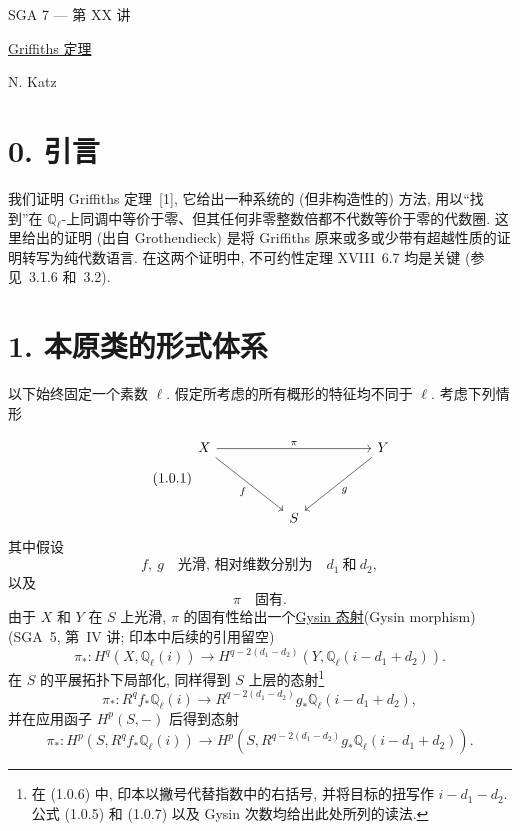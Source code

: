 \clearpage
\ExposeTOC
\begin{center}
{\large SGA 7 --- 第 XX 讲}\par
\vspace{2em}
{\Large\underline{Griffiths 定理}}\par
\vspace{1.5em}
{\large N. Katz}
\end{center}

\section*{0. 引言}

我们证明 Griffiths 定理~[1], 它给出一种系统的 (但非构造性的) 方法, 用以``找到''在 $\mathbb Q_\ell$-上同调中等价于零、但其任何非零整数倍都不代数等价于零的代数圈. 这里给出的证明 (出自 Grothendieck) 是将 Griffiths 原来或多或少带有超越性质的证明转写为纯代数语言. 在这两个证明中, 不可约性定理 XVIII~6.7 均是关键 (参见~3.1.6 和~3.2).

\section*{1. 本原类的形式体系}

以下始终固定一个素数 $\ell$. 假定所考虑的所有概形的特征均不同于 $\ell$. 考虑下列情形

\begin{equation}\tag{1.0.1}
\begin{tikzcd}[column sep=huge, row sep=huge]
X \arrow[rr, "\pi"] \arrow[dr, "f"'] & {} & Y \arrow[dl, "g"] \\
{} & S & {}
\end{tikzcd}
\end{equation}
其中假设
\begin{equation}\tag{1.0.3}
f,\ g \quad\text{光滑, 相对维数分别为}\quad d_1\ \text{和}\ d_2,
\end{equation}
以及
\begin{equation}\tag{1.0.4}
\pi\quad\text{固有}.
\end{equation}
由于 $X$ 和 $Y$ 在 $S$ 上光滑, $\pi$ 的固有性给出一个\underline{Gysin 态射}(Gysin morphism) (SGA~5, 第~IV 讲; 印本中后续的引用留空)
\begin{equation}\tag{1.0.5}
\pi_*:H^q(X,\mathbb Q_\ell(i))\longrightarrow
H^{q-2(d_1-d_2)}(Y,\mathbb Q_\ell(i-d_1+d_2)).
\end{equation}
在 $S$ 的平展拓扑下局部化, 同样得到 $S$ 上层的态射\footnote{在 (1.0.6) 中, 印本以撇号代替指数中的右括号, 并将目标的扭写作 $i-d_1-d_2$. 公式 (1.0.5) 和 (1.0.7) 以及 Gysin 次数均给出此处所列的读法.}
\begin{equation}\tag{1.0.6}
\pi_*:R^qf_*\mathbb Q_\ell(i)\longrightarrow
R^{q-2(d_1-d_2)}g_*\mathbb Q_\ell(i-d_1+d_2),
\end{equation}
并在应用函子 $H^p(S,-)$ 后得到态射
\begin{equation}\tag{1.0.7}
\pi_*:H^p(S,R^qf_*\mathbb Q_\ell(i))\longrightarrow
H^p(S,R^{q-2(d_1-d_2)}g_*\mathbb Q_\ell(i-d_1+d_2)).
\end{equation}

